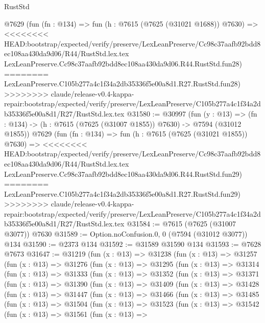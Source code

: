 \begin{lexlean}{RustStd}
\begin{coremodule}
{\begin{coremodule}
{{{{{{{{{{{{{{{{{{{{{{{{{{{{{{{{{{    @7629
    (fun (fn : @134) =>
    fun (h : @7615 (@7625 (@31021 @1688)) @7630) =>
<<<<<<<< HEAD:bootstrap/expected/verify/preserve/LexLeanPreserve/Cc98c37aafb92bdd8ec108aa430da9d06/R44/RustStd.lex.tex
    LexLeanPreserve.Cc98c37aafb92bdd8ec108aa430da9d06.R44.RustStd.fun28)
========
    LexLeanPreserve.C105b277a4c1f34a2db35336f5e00a8d1.R27.RustStd.fun28)
>>>>>>>> claude/release-v0.4-kappa-repair:bootstrap/expected/verify/preserve/LexLeanPreserve/C105b277a4c1f34a2db35336f5e00a8d1/R27/RustStd.lex.tex
@31580 := @30997
    (fun (y : @13) =>
    (fn : @134) -> (h : @7615 (@7625 (@31007 @1855)) @7630) -> @7594 (@31012 @1855))
    @7629
    (fun (fn : @134) =>
    fun (h : @7615 (@7625 (@31021 @1855)) @7630) =>
<<<<<<<< HEAD:bootstrap/expected/verify/preserve/LexLeanPreserve/Cc98c37aafb92bdd8ec108aa430da9d06/R44/RustStd.lex.tex
    LexLeanPreserve.Cc98c37aafb92bdd8ec108aa430da9d06.R44.RustStd.fun29)
========
    LexLeanPreserve.C105b277a4c1f34a2db35336f5e00a8d1.R27.RustStd.fun29)
>>>>>>>> claude/release-v0.4-kappa-repair:bootstrap/expected/verify/preserve/LexLeanPreserve/C105b277a4c1f34a2db35336f5e00a8d1/R27/RustStd.lex.tex
@31584 := @7615 (@7625 (@31007 @3077)) @7630
@31589 := Option.noConfusion.{0, 0} (@7594 (@31012 @3077)) @134
@31590 := @2373 @134
@31592 := @31589 @31590 @134
@31593 := @7628 @7673
@31647 := @31219
    (fun (x : @13) =>
    @31238
      (fun (x : @13) =>
      @31257
        (fun (x : @13) =>
        @31276
          (fun (x : @13) =>
          @31295
            (fun (x : @13) =>
            @31314
              (fun (x : @13) =>
              @31333
                (fun (x : @13) =>
                @31352
                  (fun (x : @13) =>
                  @31371
                    (fun (x : @13) =>
                    @31390
                      (fun (x : @13) =>
                      @31409
                        (fun (x : @13) =>
                        @31428
                          (fun (x : @13) =>
                          @31447
                            (fun (x : @13) =>
                            @31466
                              (fun (x : @13) =>
                              @31485
                                (fun (x : @13) =>
                                @31504
                                  (fun (x : @13) =>
                                  @31523
                                    (fun (x : @13) =>
                                    @31542
                                      (fun (x : @13) =>
                                      @31561
                                        (fun (x : @13) =>
}}}}}}}}}}}}}}}}}}}}}}}}}}}}}}}}}}
\end{coremodule}}
\end{coremodule}
\end{lexlean}
